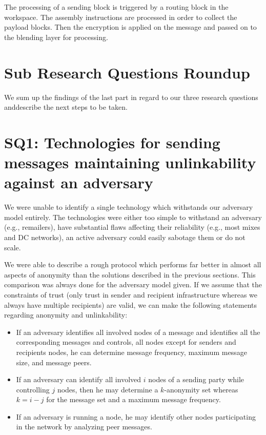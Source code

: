 The processing of a sending block is triggered by a routing block in the workspace. The assembly instructions are processed in order to collect the payload blocks. Then the encryption is applied on the message and passed on to the blending layer for processing.

\section{Sub Research Questions Roundup}
We sum up the findings of the last part in regard to our three research questions anddescribe the next steps to be taken.

\section{SQ1: Technologies for sending messages maintaining unlinkability against an adversary}
We were unable to identify a single technology which withstands our adversary model entirely. The technologies were either too simple to withstand an adversary (e.g., remailers), have substantial flaws affecting their reliability (e.g., most mixes and DC networks), an active adversary could easily sabotage them or do not scale.

We were able to describe a rough protocol which performs far better in almost all aspects of anonymity than the solutions described in the previous sections. This comparison was always done for the adversary model given. If we assume that the constraints of trust (only trust in sender and recipient infrastructure whereas we always have multiple recipients) are valid, we can make the following statements regarding anonymity and unlinkability:
\begin{itemize}
	\item If an adversary identifies all involved nodes of a message and identifies all the corresponding messages and controls, all nodes except for senders and recipients nodes, he can determine message frequency, maximum message size, and message peers.
	\item If an adversary can identify all involved $i$ nodes of a sending party while controlling $j$ nodes, then he may determine a $k$-anonymity set whereas $k=i-j$ for the message set and a maximum message frequency. 
	\item If an adversary is running a node, he may identify other nodes participating in the network by analyzing peer messages.
\end{itemize}

